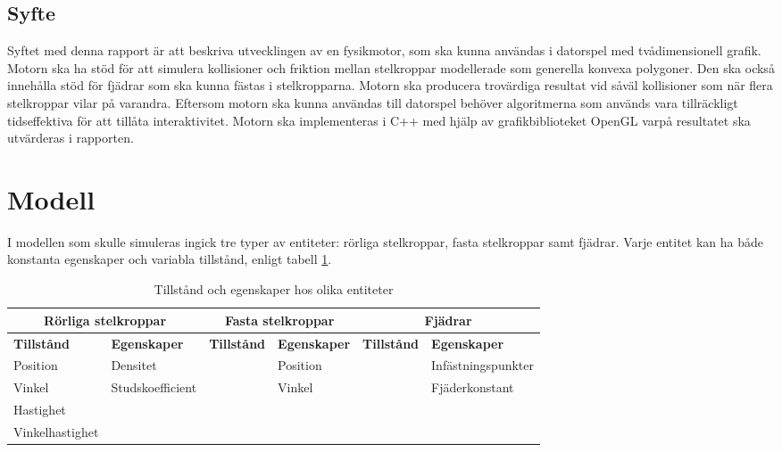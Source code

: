 \documentclass[a4paper,12pt,twopage,swedish]{article}
\begin{document}
\subsection{Syfte}
Syftet med denna rapport är att beskriva utvecklingen av en fysikmotor, som ska kunna användas i datorspel med tvådimensionell grafik. Motorn ska ha stöd för att simulera kollisioner och friktion mellan stelkroppar modellerade som generella konvexa polygoner. Den ska också innehålla stöd för fjädrar som ska kunna fästas i stelkropparna. Motorn ska producera trovärdiga resultat vid såväl kollisioner som när flera stelkroppar vilar på varandra. Eftersom motorn ska kunna användas till datorspel behöver algoritmerna som används vara tillräckligt tidseffektiva för att tillåta interaktivitet. Motorn ska implementeras i C++ med hjälp av grafikbiblioteket OpenGL varpå resultatet ska utvärderas i rapporten.


\section{Modell}
I modellen som skulle simuleras ingick tre typer av entiteter: rörliga stelkroppar, fasta stelkroppar samt fjädrar. Varje entitet kan ha både konstanta egenskaper och variabla tillstånd, enligt tabell \ref{table:states_and_properties}.

\begin{table}[!h]
	\caption{Tillstånd och egenskaper hos olika entiteter}
	\label{table:states_and_properties}
	\renewcommand{\arraystretch}{1.5}
	\begin{tabular}{|p{2.2cm}|p{2.3cm}|p{2.2cm}|p{2.3cm}|p{2.2cm}|p{2.3cm}|}
		\hline
			\multicolumn{2}{|c|}{\textbf{Rörliga stelkroppar}} & \multicolumn{2}{|c|}{\textbf{Fasta stelkroppar}} & \multicolumn{2}{|c|}{\textbf{Fjädrar}} \\
		\hline
			\textbf{Tillstånd} & \textbf{Egenskaper} & \textbf{Tillstånd} & \textbf{Egenskaper} & \textbf{Tillstånd} & \textbf{Egenskaper} \\
		\hline
			Position & Densitet & & Position & & Infästnings\-punkter \\
			Vinkel & Studs\-koefficient & & Vinkel & & Fjäder\-konstant \\
			Hastighet & & & & & {} \\
			Vinkel\-hastighet & & & & & {} \\
		\hline
	\end{tabular}
\end{table}
\end{document}
